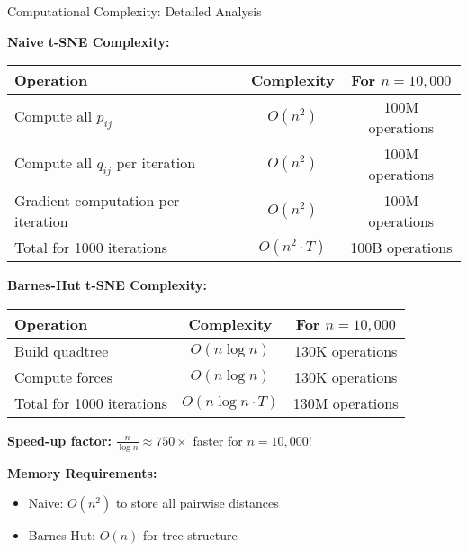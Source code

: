 \documentclass[10pt]{beamer}
\begin{document}
\begin{frame}{Computational Complexity: Detailed Analysis}

\textbf{Naive t-SNE Complexity:}
\begin{center}
\begin{tabular}{lcc}
\hline
\textbf{Operation} & \textbf{Complexity} & \textbf{For $n=10,000$} \\
\hline
Compute all $p_{ij}$ & $O(n^2)$ & 100M operations \\
Compute all $q_{ij}$ per iteration & $O(n^2)$ & 100M operations \\
Gradient computation per iteration & $O(n^2)$ & 100M operations \\
Total for 1000 iterations & $O(n^2 \cdot T)$ & 100B operations \\
\hline
\end{tabular}
\end{center}

\vspace{0.2cm}
\textbf{Barnes-Hut t-SNE Complexity:}
\begin{center}
\begin{tabular}{lcc}
\hline
\textbf{Operation} & \textbf{Complexity} & \textbf{For $n=10,000$} \\
\hline
Build quadtree & $O(n \log n)$ & 130K operations \\
Compute forces & $O(n \log n)$ & 130K operations \\
Total for 1000 iterations & $O(n \log n \cdot T)$ & 130M operations \\
\hline
\end{tabular}
\end{center}

\vspace{0.2cm}
\textbf{Speed-up factor:} $\frac{n}{\log n} \approx 750\times$ faster for $n=10,000$!

\vspace{0.1cm}
\textbf{Memory Requirements:}
\begin{itemize}
    \setlength\itemsep{0em}
    \item Naive: $O(n^2)$ to store all pairwise distances
    \item Barnes-Hut: $O(n)$ for tree structure
\end{itemize}

\end{frame}
\end{document}
